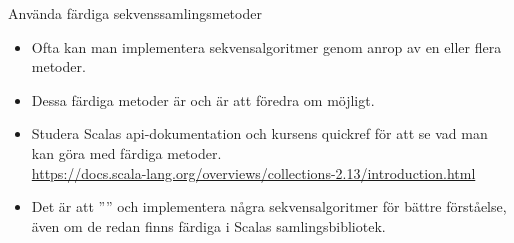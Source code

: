 \begin{Slide}{Använda färdiga sekvenssamlingsmetoder}
\begin{itemize}\SlideFontSmall
\item Ofta kan man implementera sekvensalgoritmer genom anrop av en eller flera  metoder.

\item Dessa färdiga metoder är  och är att föredra om möjligt.

\item Studera Scalas api-dokumentation och kursens quickref för att se vad man kan göra med färdiga metoder.\\
\url{https://docs.scala-lang.org/overviews/collections-2.13/introduction.html} 

\item Det är  att '''' och implementera några sekvensalgoritmer  för bättre förståelse, även om de redan finns färdiga i Scalas samlingsbibliotek.

\end{itemize}
\end{Slide}



